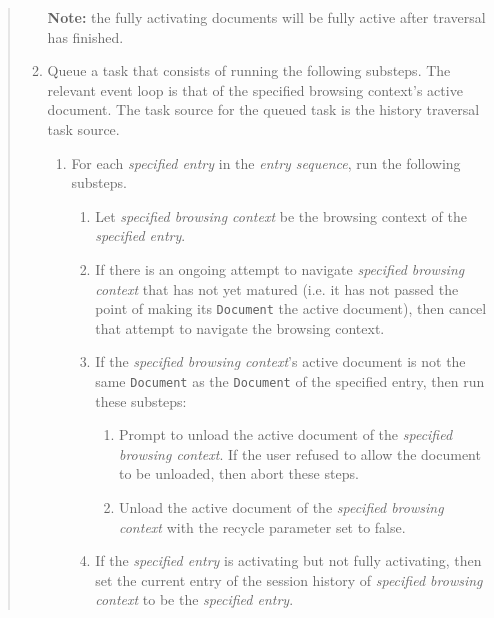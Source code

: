 \documentclass{notes}
\begin{document}
\begin{quote}
\begin{enumerate}
    \textbf{Note:} the fully activating documents
    will be fully active after traversal has finished.

  \item Queue a task that consists of running the following
    substeps. The relevant event loop is that of the specified
    browsing context's active document. The task source for the queued
    task is the history traversal task source.

    \begin{enumerate}

    \item For each \emph{specified entry} in the \emph{entry sequence},
      run the following substeps.
      \begin{enumerate}

      \item Let \emph{specified browsing context} be the browsing context of the \emph{specified entry}.

      \item If there is an ongoing attempt to navigate \emph{specified
        browsing context} that has not yet matured (i.e. it has not
        passed the point of making its \texttt{Document} the active
        document), then cancel that attempt to navigate the browsing
        context.

      \item If the \emph{specified browsing context}'s active document
        is not the same \texttt{Document} as the \texttt{Document} of
        the specified entry, then run these substeps:
        \begin{enumerate}

        \item Prompt to unload the active document of the
          \emph{specified browsing context}. If the user refused to
          allow the document to be unloaded, then abort these steps.

        \item Unload the active document of the \emph{specified
          browsing context} with the recycle parameter set to false.

        \end{enumerate}

      \item If the \emph{specified entry} is activating but not fully activating,
        then set the current entry of the session history of \emph{specified browsing context}
        to be the \emph{specified entry}.


\end{enumerate}
\end{enumerate}
\end{enumerate}
\end{quote}
\end{document}
